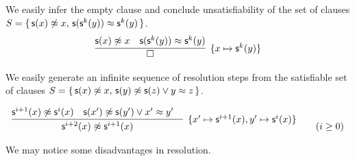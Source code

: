 
\begin{example}\label{ex:xsx:skyssky}
	We easily infer the empty clause and
	conclude unsatisfiability of the set of clauses
	\( S = \{ \,
	{ \mathsf{s}(x)\not\approx x}, \,
	{ \mathsf{s}(\mathsf{s}^k(y))\approx\mathsf{s}^k(y) }
	 \, \} \).
	\begin{gather*}
	\infer[ \{ x\mapsto\msucc^k(y) \}]
	{
		\square
	}
	{
		\msucc(x)\mNE x & \msucc(\msucc^k(y))\mEQ\msucc^k(y)
	}
	\end{gather*}
\end{example}

\begin{example}\label{ex:sat:msxx:mymzyz}
	We easily generate an infinite sequence of resolution steps from the satisfiable set of clauses
	\(
		S =
		 \{ \,
		\mathsf{s}(x)\not\approx x, \, \mathsf{s}(y)\not\approx\mathsf{s}(z) \lor y\approx z
		 \, \}
	 \).

	\begin{gather*}
	\infer
	[ \{ x'\mapsto\msucc^{i+1}(x), y'\mapsto\msucc^{i}(x)\}]
	{
		\msucc^{i+2}(x) \mNE\msucc^{i+1}(x)
	}{
		\msucc^{i+1}(x)\mNE \msucc^i(x) & \msucc(x')\mNE\msucc(y')\lor x'\mEQ y'
		&
	}
	\tag{\( i\geq 0 \)}
	\end{gather*}
\end{example}

We may notice some disadvantages in resolution.

